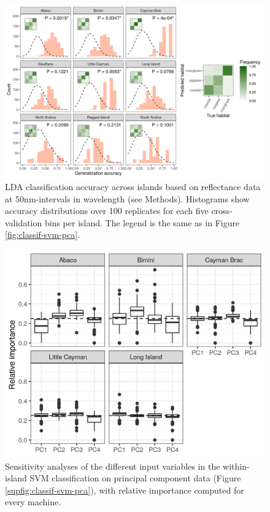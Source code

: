 \begin{figure}[H]
	\centering
	\includegraphics[width=\textwidth]{"../analyses/04-machine learning/plots/classif_lda_refl"}
	\caption{LDA classification accuracy across islands based on reflectance data at 50nm-intervals in wavelength (see Methods). Histograms show accuracy distributions over 100 replicates for each five cross-validation bins per island. The legend is the same as in Figure \ref{fig:classif-svm-pca}.}
	\label{supfig:classif-lda-refl}
\end{figure}

\begin{figure}[H]
	\centering
	\includegraphics[width=\textwidth]{"../analyses/04-machine learning/plots/importance_svm_pca"}
	\caption{Sensitivity analyses of the different input variables in the within-island SVM classification on principal component data (Figure \ref{supfig:classif-svm-pca}), with relative importance computed for every machine.}
	\label{supfig:importance-svm-pca}
\end{figure}

